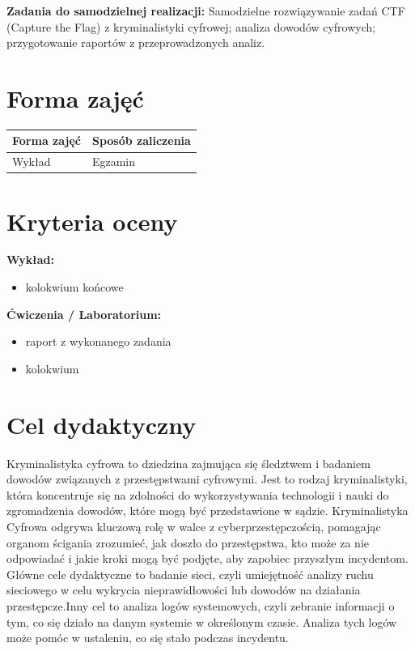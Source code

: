 \documentclass[12pt, a4paper]{article}
\newcommand{\thdrule}{\noalign{\global\setlength{\extrarowheight}{0pt}}}
\newcommand{\thdend}{\noalign{\global\setlength{\extrarowheight}{3pt}}}
\begin{document}
\vspace{4pt}
\noindent\textbf{Zadania do samodzielnej realizacji:} Samodzielne rozwiązywanie zadań CTF (Capture the Flag) z kryminalistyki cyfrowej; analiza dowodów cyfrowych; przygotowanie raportów z przeprowadzonych analiz.

\section{Forma zajęć}

\begin{center}
{\scriptsize
\begin{tabular}{m{5cm}m{8cm}}
\thdrule\toprule
\rowcolor{pjatkRed} {\color{white}\textbf{Forma zajęć}} & {\color{white}\textbf{Sposób zaliczenia}} \\
\midrule\thdend
  \rowcolor{tableRowLight} Wykład & Egzamin \\
\bottomrule
\end{tabular}}
\end{center}

\section{Kryteria oceny}

\textbf{Wykład:}
\begin{itemize}
  \item kolokwium końcowe
\end{itemize}
\vspace{4pt}
\textbf{Ćwiczenia / Laboratorium:}
\begin{itemize}
  \item raport z wykonanego zadania
  \item kolokwium
\end{itemize}


\section{Cel dydaktyczny}

Kryminalistyka cyfrowa to dziedzina zajmująca się śledztwem i badaniem dowodów związanych z przestępstwami cyfrowymi. Jest to rodzaj kryminalistyki, która koncentruje się na zdolności do wykorzystywania technologii i nauki do zgromadzenia dowodów, które mogą być przedstawione w sądzie. Kryminalistyka Cyfrowa odgrywa kluczową rolę w walce z cyberprzestępczością, pomagając organom ścigania zrozumieć, jak doszło do przestępstwa, kto może za nie odpowiadać i jakie kroki mogą być podjęte, aby zapobiec przyszłym incydentom. Główne cele dydaktyczne to badanie sieci, czyli umiejętność analizy ruchu sieciowego w celu wykrycia nieprawidłowości lub dowodów na działania przestępcze.Inny cel to analiza logów systemowych, czyli zebranie informacji o tym, co się działo na danym systemie w określonym czasie. Analiza tych logów może pomóc w ustaleniu, co się stało podczas incydentu.
\end{document}
